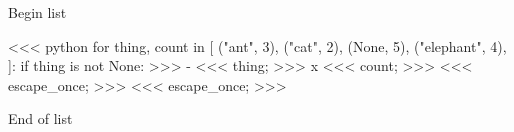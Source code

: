 Begin list

<<< python
for thing, count in [
    ("ant", 3),
    ("cat", 2),
    (None, 5),
    ("elephant", 4),
]:
    if thing is not None:
>>>
- <<< thing; >>> x <<< count; >>>
<<< escape_once; >>>
<<< escape_once; >>>

End of list
